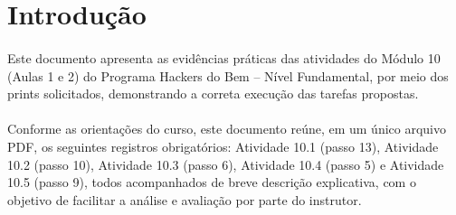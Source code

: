 \section{Introdução}

\paragraph{}
Este documento apresenta as evidências práticas das atividades do Módulo 10
(Aulas 1 e 2) do Programa Hackers do Bem -- Nível Fundamental, por meio dos
prints solicitados, demonstrando a correta execução das tarefas propostas.

\paragraph{}
Conforme as orientações do curso, este documento reúne, em um único arquivo
PDF, os seguintes registros obrigatórios: Atividade 10.1 (passo 13), Atividade
10.2 (passo 10), Atividade 10.3 (passo 6), Atividade 10.4 (passo 5) e Atividade
10.5 (passo 9), todos acompanhados de breve descrição explicativa, com o
objetivo de facilitar a análise e avaliação por parte do instrutor.
